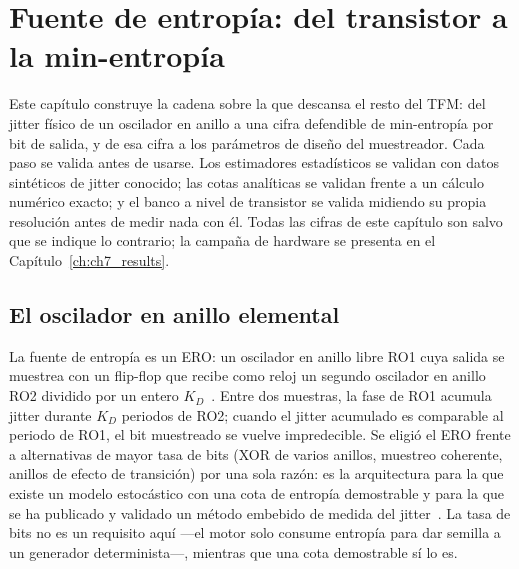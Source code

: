 \chapter{Fuente de entropía: del transistor a la min-entropía}
\label{ch:ch3_entropy}


Este capítulo construye la cadena sobre la que descansa el resto del TFM:
del jitter físico de un oscilador en anillo a una cifra defendible de
min-entropía por bit de salida, y de esa cifra a los parámetros de diseño
del muestreador. Cada paso se valida antes de usarse. Los estimadores
estadísticos se validan con datos sintéticos de jitter conocido; las cotas
analíticas se validan frente a un cálculo numérico exacto; y el banco a
nivel de transistor se valida midiendo su propia resolución antes de medir
nada con él. Todas las cifras de este capítulo son \simu{} salvo que se
indique lo contrario; la campaña de hardware se presenta en el
Capítulo~\ref{ch:ch7_results}.

\section{El oscilador en anillo elemental}
\label{sec:ero}

La fuente de entropía es un \ac{ERO}: un oscilador en anillo libre RO1
cuya salida se muestrea con un flip-flop que recibe como reloj un segundo
oscilador en anillo RO2 dividido por un entero $K_D$~\cite{baudet_2011_security,
fischer_2014_embedded}. Entre dos muestras, la fase de RO1 acumula jitter
durante $K_D$ periodos de RO2; cuando el jitter acumulado es comparable al
periodo de RO1, el bit muestreado se vuelve impredecible. Se eligió el
\ac{ERO} frente a alternativas de mayor tasa de bits (XOR de varios
anillos, muestreo coherente, anillos de efecto de transición) por una sola
razón: es la arquitectura para la que existe un modelo estocástico con una
cota de entropía demostrable y para la que se ha publicado y validado un
método embebido de medida del jitter~\cite{fischer_2014_embedded,
petura_2016_survey}. La tasa de
bits no es un requisito aquí ---el motor solo consume entropía para dar
semilla a un generador determinista---, mientras que una cota demostrable
sí lo es.

